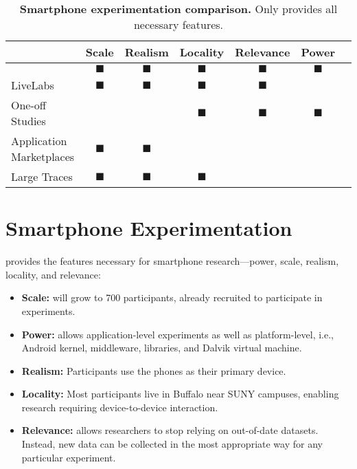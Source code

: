 \begin{table*}[t]
\begin{tabularx}{\textwidth}{Xcccccc}
& {\normalsize{\textbf{Scale}}} &
{\normalsize{\textbf{Realism}}} &
{\normalsize{\textbf{Locality}}} &
{\normalsize{\textbf{Relevance}}} &
{\normalsize{\textbf{Power}}} \\
\toprule

{\large \PhoneLab{}}
& $\blacksquare$ & $\blacksquare$ & $\blacksquare$ & $\blacksquare$ & $\blacksquare$ \\
\toprule

LiveLabs &
$\blacksquare$ & $\blacksquare$ & $\blacksquare$ & $\blacksquare$ & & \\
\midrule

One-off Studies &
& & $\blacksquare$ & $\blacksquare$ & $\blacksquare$ \\
\midrule

Application Marketplaces &
$\blacksquare$ & $\blacksquare$ & & & \\
\midrule

Large Traces &
$\blacksquare$ & $\blacksquare$ & $\blacksquare$ & & \\
\bottomrule

\end{tabularx}
\caption{\textbf{Smartphone experimentation comparison.} Only \PhoneLab{}
provides all necessary features.}
\label{tab:comparison}
\end{table*}

\section{Smartphone Experimentation}
\label{sec-comparison}

\PhoneLab{} provides the features necessary for smartphone research---power,
scale, realism, locality, and relevance:

\begin{itemize}[nosep,leftmargin=*]
\vspace*{0.08in}
\item {\bf Scale:} \PhoneLab{} will grow to 700 participants, already
recruited to participate in experiments.
\item {\bf Power:} \PhoneLab{} allows application-level experiments as well
as platform-level, i.e., Android kernel, middleware, libraries, and Dalvik
virtual machine.
\item {\bf Realism:} Participants use the phones as their primary device.
\item {\bf Locality:} Most participants live in Buffalo near SUNY campuses,
enabling research requiring device-to-device interaction.
\item {\bf Relevance:} \PhoneLab{} allows researchers to stop relying on
out-of-date datasets. Instead, new data can be collected in the most
appropriate way for any particular experiment.
\vspace*{0.08in}
\end{itemize}

